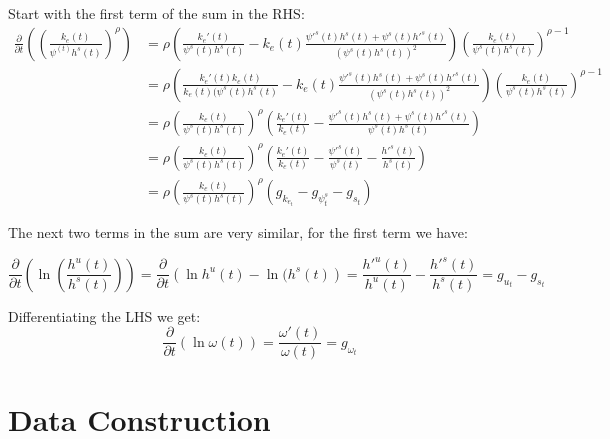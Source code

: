 \documentclass[12pt]{article}
\begin{document}
Start with the first term of the sum in the RHS:
\begin{align*}
 \frac{\partial}{\partial t}\left(\left(\frac{k_{e}(t)}{\psi^(t)h^s(t) }\right)^\rho\right) &= \rho\left( \frac{ k_e'(t)}{\psi^s(t)h^s(t)} - k_e(t) \frac{\psi'^s(t)h^s(t) + \psi^s(t) h'^s(t)}{(\psi^s(t)h^s(t))^2} \right)\left(\frac{k_{e}(t)}{\psi^s(t)h^s(t) }\right)^{\rho-1} \\
 &= \rho\left( \frac{ k_e'(t) k_e(t)}{k_e(t)(\psi^s(t)h^s(t)} - k_e(t) \frac{\psi'^s(t)h^s(t) + \psi^s(t) h'^s(t)}{(\psi^s(t)h^s(t))^2} \right)\left(\frac{k_{e}(t)}{\psi^s(t)h^s(t) }\right)^{\rho-1}\\
 &= \rho\left(\frac{k_e(t)}{\psi^s(t)h^s(t)}\right)^{\rho} \left( \frac{ k_e'(t) }{k_e(t)} - \frac{\psi'^s(t)h^s(t) + \psi^s(t) h'^s(t)}{\psi^s(t)h^s(t)} \right)\\
 &= \rho\left(\frac{k_e(t)}{\psi^s(t)h^s(t)}\right)^{\rho} \left( \frac{ k_e'(t) }{k_e(t)} - \frac{\psi'^s(t)}{\psi^s(t)} - \frac{ h'^s(t)}{h^s(t)} \right)\\
 &= \rho\left(\frac{k_e(t)}{\psi^s(t)h^s(t)}\right)^{\rho}(g_{k_{e_{t}}} - g_{\psi^s_t} - g_{s_t})
\end{align*}

The next two terms in the sum are very similar, for the first term we have:

\begin{equation}
 \frac{\partial}{\partial t} \left( \ln{\left( \frac{h^u(t) }{h^s(t)} \right)} \right) = \frac{\partial}{\partial t} \left( \ln{h^u(t)} - \ln{(h^s(t)} \right) = \frac{h'^u(t)}{h^u(t)} - \frac{h'^s(t)}{h^s(t)} = g_{u_t} - g_{s_t}
\end{equation}
 
Differentiating the LHS we get:
$$\frac{\partial}{\partial t}\left(\ln{\omega(t)}\right) = \frac{\omega'(t)}{\omega(t)} = g_{\omega_t}$$


\section{Data Construction}\label{sec:data-construction}


\end{document}
